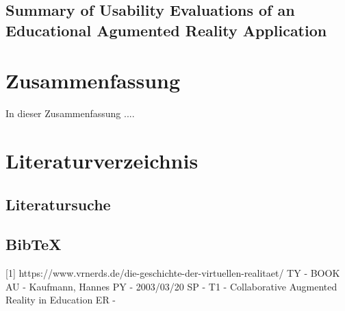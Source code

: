 \documentclass[deutsch]{llncs}
\begin{document}
\subsection{Summary of Usability Evaluations of an Educational Agumented Reality Application}



 

\section{Zusammenfassung}
\label{sec:typo}
In dieser Zusammenfassung .... 

\section{Literaturverzeichnis}
\label{sec:bib}

\subsection{Literatursuche}
\label{subsec:search}


\subsection{BibTeX}
\label{subsec:bibtex}
[1] https://www.vrnerds.de/die-geschichte-der-virtuellen-realitaet/
\cite{2 http://virtualrealityforeducation.com/wp-content/uploads/2018/06/HuAu_Lee_2017_VRinEd.pdf}
TY  - BOOK
AU  - Kaufmann, Hannes
PY  - 2003/03/20
SP  - 
T1  - Collaborative Augmented Reality in Education
ER  - 

\printbibliography
\end{document}
